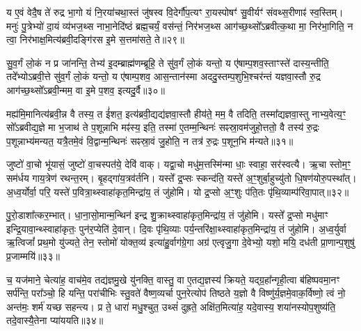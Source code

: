 य ए॒वं वेदै॒ष ते॑ रुद्र भा॒गो यं नि॒रया॑चथा॒स्तं जु॑षस्व वि॒देर्गौ॑प॒त्यꣳ रा॒यस्पोषꣳ॑ सु॒वीर्यꣳ॑ संवथ्स॒रीणाꣴ॑ स्व॒स्तिम्। मनुः॑ पु॒त्रेभ्यो॑ दा॒यं व्य॑भज॒थ्स नाभा॒नेदि॑ष्ठं ब्रह्म॒चर्यं॒ वस॑न्तं॒ निर॑भज॒थ्स आग॑च्छ॒थ्सो᳚\-ऽब्रवीत्क॒था मा॒ निर॑भा॒गिति॒ न त्वा॒ निर॑भाक्ष॒मित्य॑ब्रवी॒दङ्गि॑रस इ॒मे स॒त्तमा॑सते॒ ते॥२९॥

सु॒व॒र्गं लो॒कं न प्र जा॑नन्ति॒ तेभ्य॑ इ॒दम्ब्राह्म॑णम्ब्रूहि॒ ते सु॑व॒र्गं लो॒कं यन्तो॒ य ए॑षाम्प॒शव॒स्ताꣳस्ते॑ दास्य॒न्तीति॒ तदे᳚भ्यो\-ऽब्रवी॒त्ते सु॑व॒र्गं लो॒कं यन्तो॒ य ए॑षाम्प॒शव॒ आस॒न्तान॑स्मा अददु॒स्तम्प॒शुभि॒श्चर॑न्तं यज्ञवा॒स्तौ रु॒द्र आग॑च्छ॒थ्सो᳚\-ऽब्रवी॒न्मम॒ वा इ॒मे प॒शव॒ इत्यदु॒र्वै॥३०॥

मह्य॑मि॒मानित्य॑ब्रवी॒न्न वै तस्य॒ त ई॑शत॒ इत्य॑ब्रवी॒द्यद्य॑ज्ञवा॒स्तौ हीय॑ते॒ मम॒ वै तदिति॒ तस्मा᳚द्यज्ञवा॒स्तु नाभ्य॒वेत्य॒ꣳ॒ सो᳚\-ऽब्रवीद्य॒ज्ञे मा भ॒जाथ॑ ते प॒शून्नाभि मꣴ॑स्य॒ इति॒ तस्मा॑ ए॒तम्म॒न्थिनः॑ सꣴस्रा॒वम॑जुहो॒त्ततो॒ वै तस्य॑ रु॒द्रः प॒शून्नाभ्य॑मन्यत॒ यत्रै॒तमे॒वं वि॒द्वान्म॒न्थिनः॑ सꣴस्रा॒वं जु॒होति॒ न तत्र॑ रु॒द्रः प॒शून॒भि म॑न्यते॥३१॥

{}

जुष्टो॑ वा॒चो भू॑यासं॒ जुष्टो॑ वा॒चस्पत॑ये॒ देवि॑ वाक्। यद्वा॒चो मधु॑म॒त्तस्मि॑न्मा धाः॒ स्वाहा॒ सर॑स्वत्यै। ऋ॒चा स्तोम॒ꣳ॒ सम॑र्धय गाय॒त्रेण॑ रथन्त॒रम्। बृ॒हद्गा॑य॒त्रव॑र्तनि। यस्ते᳚ द्र॒प्सः स्कन्द॑ति॒ यस्ते॑ अ॒ꣳ॒शुर्बा॒हुच्यु॑तो धि॒षण॑योरु॒पस्था᳚त्। अ॒ध्व॒र्योर्वा॒ परि॒ यस्ते॑ प॒वित्रा॒थ्स्वाहा॑कृत॒मिन्द्रा॑य॒ तं जु॑होमि। यो द्र॒प्सो अ॒ꣳ॒शुः प॑ति॒तः पृ॑थि॒व्याम्प॑रिवा॒पात्॥३२॥

पु॒रो॒डाशा᳚त्कर॒म्भात्। धा॒ना॒सो॒मान्म॒न्थिन॑ इन्द्र शु॒क्राथ्स्वाहा॑कृत॒मिन्द्रा॑य॒ तं जु॑होमि। यस्ते᳚ द्र॒प्सो मधु॑माꣳ इन्द्रि॒यावा॒न्थ्स्वाहा॑कृतः॒ पुन॑र॒प्येति॑ दे॒वान्। दि॒वः पृ॑थि॒व्याः पर्य॒न्तरि॑क्षा॒थ्स्वाहा॑कृत॒मिन्द्रा॑य॒ तं जु॑होमि। अ॒ध्व॒र्युर्वा ऋ॒त्विजां᳚ प्रथ॒मो यु॑ज्यते॒ तेन॒ स्तोमो॑ योक्त॒व्य॑ इत्या॑हु॒र्वाग॑ग्रे॒गा अग्र॑ एत्वृजु॒गा दे॒वेभ्यो॒ यशो॒ मयि॒ दध॑ती प्रा॒णान्प॒शुषु॑ प्र॒जाम्मयि॑॥३३॥

च॒ यज॑माने॒ चेत्या॑ह॒ वाच॑मे॒व तद्य॑ज्ञमु॒खे यु॑नक्ति॒ वास्तु॒ वा ए॒तद्य॒ज्ञस्य॑ क्रियते॒ यद्ग्र॒हा᳚न्गृही॒त्वा ब॑हिष्पवमा॒नꣳ सर्प॑न्ति॒ परा᳚ञ्चो॒ हि यन्ति॒ परा॑चीभिः स्तु॒वते॑ वैष्ण॒व्यर्चा पुन॒रेत्योप॑ तिष्ठते य॒ज्ञो वै विष्णु॑र्य॒ज्ञमे॒वाक॒र्विष्णो॒ त्वं नो॒ अन्त॑मः॒ शर्म॑ यच्छ सहन्त्य। प्र ते॒ धारा॑ मधु॒श्चुत॒ उथ्सं॑ दुह्रते॒ अक्षि॑त॒मित्या॑ह॒ यदे॒वास्य॒ शया॑नस्योप॒शुष्य॑ति॒ तदे॒वास्यै॒तेना प्या॑ययति॥३४॥


